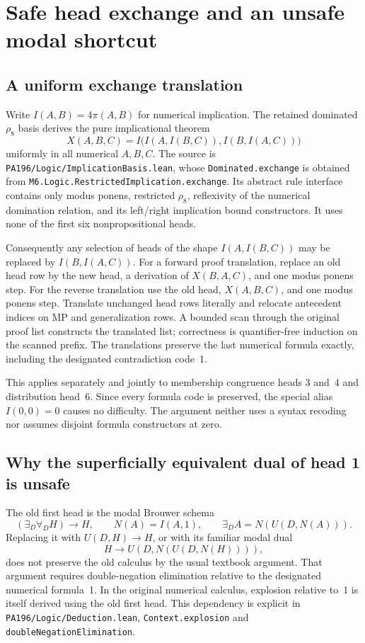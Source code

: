 \section{Safe head exchange and an unsafe modal shortcut}
\label{sec:head-exchange}

\subsection{A uniform exchange translation}

Write $I(A,B)=4\pi(A,B)$ for numerical implication. The retained
dominated $\rho_8$ basis derives the pure implicational theorem
\[
 X(A,B,C)=I\bigl(I(A,I(B,C)),I(B,I(A,C))\bigr)
\]
uniformly in all numerical $A,B,C$. The source is
\texttt{PA196/Logic/ImplicationBasis.lean}, whose
\texttt{Dominated.exchange} is obtained from
\texttt{M6.Logic.RestrictedImplication.exchange}. Its abstract rule
interface contains only modus ponens, restricted $\rho_8$, reflexivity
of the numerical domination relation, and its left/right implication
bound constructors. It uses none of the first six nonpropositional heads.

Consequently any selection of heads of the shape $I(A,I(B,C))$ may be
replaced by $I(B,I(A,C))$. For a forward proof translation, replace an
old head row by the new head, a derivation of $X(B,A,C)$, and one modus
ponens step. For the reverse translation use the old head,
$X(A,B,C)$, and one modus ponens step. Translate unchanged head rows
literally and relocate antecedent indices on MP and generalization rows.
A bounded scan through the original proof list constructs the translated
list; correctness is quantifier-free induction on the scanned prefix.
The translations preserve the last numerical formula exactly, including
the designated contradiction code~1.

This applies separately and jointly to membership congruence heads 3
and~4 and distribution head~6. Since every formula code is preserved,
the special alias $I(0,0)=0$ causes no difficulty. The argument neither
uses a syntax recoding nor assumes disjoint formula constructors at zero.

\subsection{Why the superficially equivalent dual of head 1 is unsafe}

The old first head is the modal Brouwer schema
\[
 (\exists_D\forall_D H)\to H,
\qquad N(A)=I(A,1),\qquad
 \exists_D A=N(U(D,N(A))).
\]
Replacing it with $U(D,H)\to H$, or with its familiar modal dual
\[
 H\to U(D,N(U(D,N(H)))),
\]
does not preserve the old calculus by the usual textbook argument.
That argument requires double-negation elimination relative to the
designated numerical formula~1. In the original numerical calculus,
explosion relative to~1 is itself derived using the old first head.
This dependency is explicit in
\texttt{PA196/Logic/Deduction.lean},
\texttt{Context.explosion} and
\texttt{doubleNegationElimination}.

